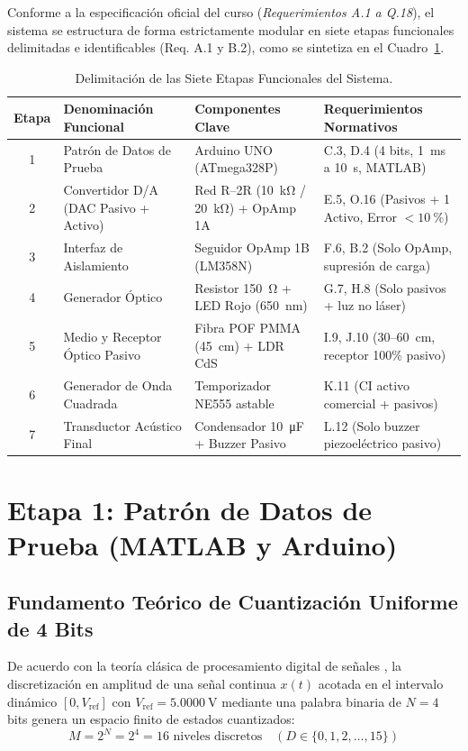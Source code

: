 \documentclass[11pt,letterpaper]{article}
\begin{document}
Conforme a la especificación oficial del curso (\emph{Requerimientos A.1 a Q.18}), el sistema se estructura de forma estrictamente modular en siete etapas funcionales delimitadas e identificables (Req. A.1 y B.2), como se sintetiza en el Cuadro~\ref{tab:etapas_sistema}.

\begin{table}[htbp]
\centering
\caption{Delimitación de las Siete Etapas Funcionales del Sistema.}
\label{tab:etapas_sistema}
\small
\renewcommand{\arraystretch}{1.2}
\begin{tabular}{cp{4.8cm}p{4.2cm}p{4.5cm}}
\toprule
\textbf{Etapa} & \textbf{Denominación Funcional} & \textbf{Componentes Clave} & \textbf{Requerimientos Normativos} \\
\midrule
1 & Patrón de Datos de Prueba & Arduino UNO (ATmega328P) & C.3, D.4 (4 bits, \SI{1}{\milli\second} a \SI{10}{\second}, MATLAB) \\
2 & Convertidor D/A (DAC Pasivo + Activo) & Red R--2R (\SI{10}{\kilo\ohm} / \SI{20}{\kilo\ohm}) + OpAmp 1A & E.5, O.16 (Pasivos + 1 Activo, Error $< \SI{10}{\percent}$) \\
3 & Interfaz de Aislamiento & Seguidor OpAmp 1B (LM358N) & F.6, B.2 (Solo OpAmp, supresión de carga) \\
4 & Generador Óptico & Resistor \SI{150}{\ohm} + LED Rojo (\SI{650}{\nano\meter}) & G.7, H.8 (Solo pasivos + luz no láser) \\
5 & Medio y Receptor Óptico Pasivo & Fibra POF PMMA (\SI{45}{\centi\meter}) + LDR CdS & I.9, J.10 (30--\SI{60}{\centi\meter}, receptor 100\% pasivo) \\
6 & Generador de Onda Cuadrada & Temporizador NE555 astable & K.11 (CI activo comercial + pasivos) \\
7 & Transductor Acústico Final & Condensador \SI{10}{\micro\farad} + Buzzer Pasivo & L.12 (Solo buzzer piezoeléctrico pasivo) \\
\bottomrule
\end{tabular}
\end{table}

\section{Etapa 1: Patrón de Datos de Prueba (MATLAB y Arduino)}

\subsection{Fundamento Teórico de Cuantización Uniforme de 4 Bits}
De acuerdo con la teoría clásica de procesamiento digital de señales \cite{proakis2007,sedra2020}, la discretización en amplitud de una señal continua $x(t)$ acotada en el intervalo dinámico $[0, V_{\text{ref}}]$ con $V_{\text{ref}} = \SI{5.0000}{\volt}$ mediante una palabra binaria de $N = 4$ bits genera un espacio finito de estados cuantizados:
\begin{equation}
M = 2^N = 2^4 = 16\text{ niveles discretos}\quad (D \in \{0, 1, 2, \dots, 15\})
\label{eq:niveles}
\end{equation}
\end{document}
